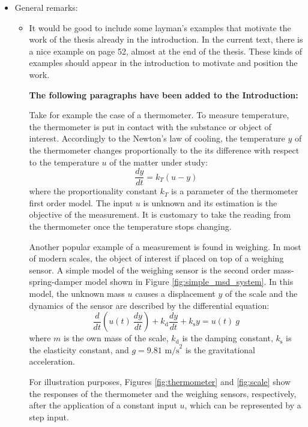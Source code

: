 \documentclass[11pt]{article}
\begin{document}
\begin{itemize}
    \item General remarks:
    \begin{itemize}
    \item  It would be good to include some layman’s examples that motivate the work of the thesis already in the introduction. In the current text, there is a nice example on page 52, almost at the end of the thesis. These kinds of examples should appear in the introduction to motivate and position the work.
    
    {\bfseries The following paragraphs have been added to the Introduction: }
    
    \color{blue}

    Take for example the case of a thermometer.
    To measure temperature, the thermometer is put in contact with the substance or object of interest.
    Accordingly to the Newton's law of cooling, the temperature $y$ of the thermometer changes proportionally to the its difference with respect to the temperature $u$ of the matter under study:
    \begin{equation} \tag{2.1}  \dfrac{dy}{dt} = k_T \left( u - y \right) \label{eqn:NewtonCooling} \end{equation}
    where the proportionality constant $k_T$ is a parameter of the thermometer first order model.
    The input $u$ is unknown and its estimation is the objective of the measurement.
    It is customary to take the reading from the thermometer once the temperature stops changing. 

    Another popular example of a measurement is found in weighing. 
    In most of modern scales, the object of interest if placed on top of a weighing sensor.
    A simple model of the weighing sensor is the second order mass-spring-damper model shown in Figure \ref{fig:simple_msd_system}.
    In this model, the unknown mass $u$ causes a displacement $y$ of the scale and the dynamics of the sensor are described by the differential equation:
    \begin{equation} \tag{2.2} \dfrac{d}{dt} \left( u(t) \ \dfrac{dy}{dt} \right) + k_{\mathrm{d}} \dfrac{dy}{dt} + k_{\mathrm{s}} y = u(t) \ g \end{equation}
    where $m$ is the own mass of the scale, $k_{\mathrm{d}}$ is the damping constant, $k_{\mathrm{s}}$ is the elasticity constant, and $g = 9.81$ $\mathrm{m/s}^2$ is the gravitational acceleration. 

    For illustration purposes, Figures \ref{fig:thermometer} and \ref{fig:scale} show the responses of the thermometer and the weighing sensors, respectively, after the application of a constant input $u$, which can be represented by a step input. 


\end{itemize}
\end{itemize}
\end{document}
